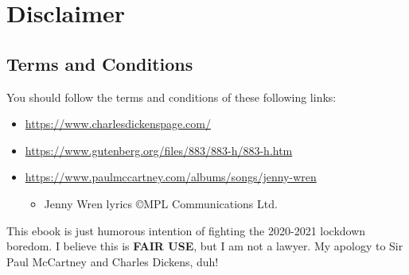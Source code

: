 \documentclass[12pt]{book}
\begin{document}
\part{Disclaimer}

\thispagestyle{plain}

\chapter*{Terms and Conditions}

You should follow the terms and conditions of these following links:
\begin{itemize}
\item \url{https://www.charlesdickenspage.com/}
\item \url{https://www.gutenberg.org/files/883/883-h/883-h.htm}
\item \url{https://www.paulmccartney.com/albums/songs/jenny-wren}
\begin{itemize}
\item Jenny Wren lyrics \copyright MPL Communications Ltd.
\end{itemize}
\end{itemize}

\noindent
This ebook is just humorous intention of fighting the 2020-2021 lockdown boredom.
I believe this is \textbf{FAIR USE}, but I am not a lawyer.
My apology to Sir Paul McCartney and Charles Dickens, duh!



\end{document}

